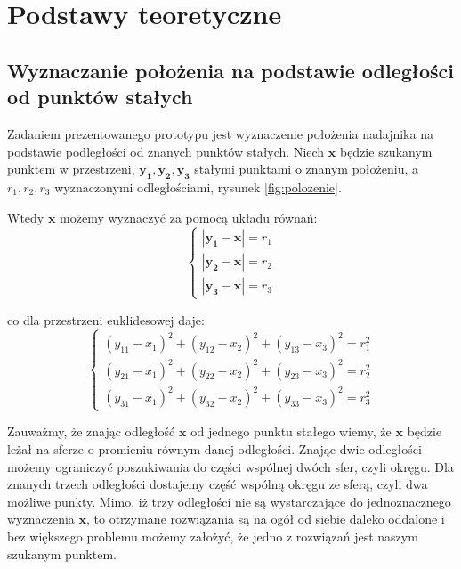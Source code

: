 \chapter{Podstawy teoretyczne}
\section{Wyznaczanie położenia na podstawie odległości od punktów stałych}

Zadaniem prezentowanego prototypu jest wyznaczenie położenia nadajnika na podstawie
podległości od znanych punktów stałych. Niech $\boldsymbol{x}$ będzie szukanym punktem w przestrzeni,
$\boldsymbol{y_1,y_2,y_3}$ stałymi punktami o znanym położeniu, a $r_1,r_2,r_3$ wyznaczonymi odległościami, 
rysunek \ref{fig:polozenie}. 

Wtedy $\boldsymbol{x}$ możemy wyznaczyć za pomocą układu równań:
\[
 \begin{cases}
    |\boldsymbol{y_1} - \boldsymbol{x}| = r_1
 \\ |\boldsymbol{y_2} - \boldsymbol{x}| = r_2
 \\ |\boldsymbol{y_3} - \boldsymbol{x}| = r_3
 \end{cases}
\]

co dla przestrzeni euklidesowej daje:
\[
 \begin{cases}
     (y_{11}-x_1)^2 + (y_{12}-x_2)^2 + (y_{13}-x_3)^2 = r_1^2
 \\  (y_{21}-x_1)^2 + (y_{22}-x_2)^2 + (y_{23}-x_3)^2 = r_2^2
 \\  (y_{31}-x_1)^2 + (y_{32}-x_2)^2 + (y_{33}-x_3)^2 = r_3^2
 \end{cases}
\]

Zauważmy, że znając odległość $\boldsymbol{x}$ od jednego punktu stałego wiemy, że $\boldsymbol{x}$ będzie leżał na
sferze o promieniu równym danej odległości. Znając dwie odległości możemy ograniczyć poszukiwania do części wspólnej dwóch sfer,
czyli okręgu. Dla znanych trzech odległości dostajemy część wspólną okręgu ze sferą, czyli dwa możliwe punkty.
Mimo, iż trzy odległości nie są wystarczające do jednoznacznego wyznaczenia $\boldsymbol{x}$, 
to otrzymane rozwiązania są na ogół od siebie daleko oddalone i bez większego problemu
możemy założyć, że jedno z rozwiązań jest naszym szukanym punktem.

